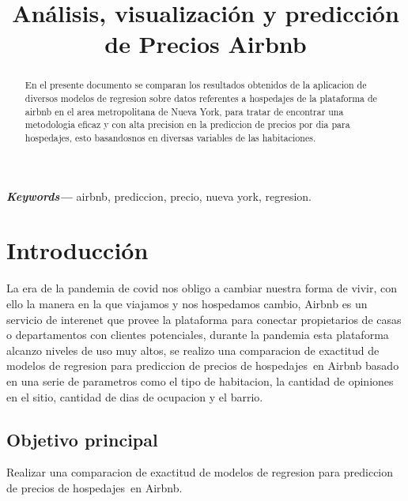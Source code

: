 \documentclass[conference]{IEEEtran}
\begin{document}
\title{Análisis, visualización y predicción de Precios Airbnb}

\author{%
}

\maketitle

\begin{abstract}
En el presente documento se comparan los resultados obtenidos de la aplicacion de diversos modelos de regresion sobre datos referentes a hospedajes de la plataforma de airbnb en el area metropolitana de Nueva York, para tratar de encontrar una metodologia eficaz y con alta precision en la prediccion de precios por dia para hospedajes, esto basandosnos en diversas variables de las habitaciones.
\end{abstract}

\providecommand{\keywords}[1]
{
  \small	
  \textbf{\textit{Keywords---}} #1
}
\keywords{airbnb, prediccion, precio, nueva york, regresion.}

\section{Introducción}
La era de la pandemia de covid nos obligo a cambiar nuestra forma de vivir, con ello la manera en la que viajamos y nos hospedamos cambio, Airbnb es un servicio de interenet que provee la plataforma para conectar propietarios de casas o departamentos con clientes potenciales, durante la pandemia esta plataforma alcanzo niveles de uso muy altos, se realizo una comparacion de exactitud de modelos de regresion para prediccion de precios de hospedajes en Airbnb basado en una serie de parametros como el tipo de habitacion, la cantidad de opiniones en el sitio, cantidad de dias de ocupacion y el barrio.

\subsection{Objetivo principal}
Realizar una comparacion de exactitud de modelos de regresion para prediccion de precios de hospedajes en Airbnb.
\end{document}
